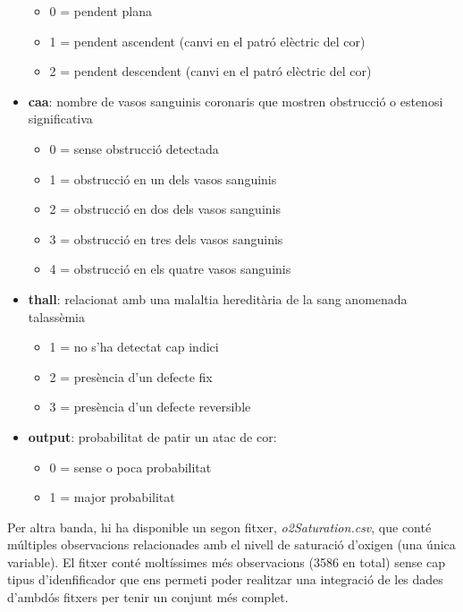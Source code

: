 \documentclass[
]{article}
\providecommand{\tightlist}{%
  \setlength{\itemsep}{0pt}\setlength{\parskip}{0pt}}
\begin{document}
\begin{itemize}
  \begin{itemize}
  \tightlist
  \item
    0 = pendent plana
  \item
    1 = pendent ascendent (canvi en el patró elèctric del cor)
  \item
    2 = pendent descendent (canvi en el patró elèctric del cor)
  \end{itemize}
\item
  \textbf{caa}: nombre de vasos sanguinis coronaris que mostren
  obstrucció o estenosi significativa

  \begin{itemize}
  \tightlist
  \item
    0 = sense obstrucció detectada
  \item
    1 = obstrucció en un dels vasos sanguinis
  \item
    2 = obstrucció en dos dels vasos sanguinis
  \item
    3 = obstrucció en tres dels vasos sanguinis
  \item
    4 = obstrucció en els quatre vasos sanguinis
  \end{itemize}
\item
  \textbf{thall}: relacionat amb una malaltia hereditària de la sang
  anomenada talassèmia

  \begin{itemize}
  \tightlist
  \item
    1 = no s'ha detectat cap indici
  \item
    2 = presència d'un defecte fix
  \item
    3 = presència d'un defecte reversible
  \end{itemize}
\item
  \textbf{output}: probabilitat de patir un atac de cor:

  \begin{itemize}
  \tightlist
  \item
    0 = sense o poca probabilitat
  \item
    1 = major probabilitat
  \end{itemize}
\end{itemize}

Per altra banda, hi ha disponible un segon fitxer,
\emph{o2Saturation.csv}, que conté múltiples observacions relacionades
amb el nivell de saturació d'oxigen (una única variable). El fitxer
conté moltíssimes més observacions (3586 en total) sense cap tipus
d'idenfificador que ens permeti poder realitzar una integració de les
dades d'ambdós fitxers per tenir un conjunt més complet.
\end{document}
